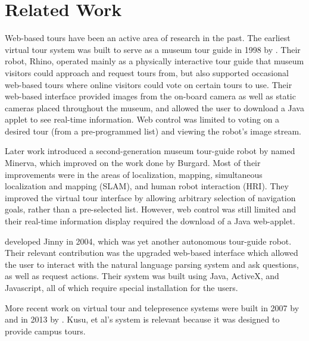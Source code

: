 \documentclass[
  oneside,
  11pt, a4paper,
  footinclude=true,
  headinclude=true,
  cleardoublepage=empty
]{article}
\begin{document}
\section{Related Work}\label{sec:related}

Web-based tours have been an active area of research in the past. The earliest
virtual tour system was built to serve as a museum tour guide in 1998 by
\citet{burgard1998}. Their robot, Rhino, operated mainly as a physically
interactive tour guide that museum visitors could approach and request tours
from, but also supported occasional web-based tours where online visitors could
vote on certain tours to use. Their web-based interface provided images from
the on-board camera as well as static cameras placed throughout the museum, and
allowed the user to download a Java applet to see real-time information. Web
control was limited to voting on a desired tour (from a pre-programmed list)
and viewing the robot's image stream.

Later work introduced a second-generation museum tour-guide robot by
\citet{thrun1999} named Minerva, which improved on the work done by Burgard.
Most of their improvements were in the areas of localization, mapping,
simultaneous localization and mapping (SLAM), and human robot interaction
(HRI). They improved the virtual tour interface by allowing arbitrary selection
of navigation goals, rather than a pre-selected list. However, web control was
still limited and their real-time information display required the download of
a Java web-applet.

\citet{kim2004} developed Jinny in 2004, which was yet another autonomous
tour-guide robot. Their relevant contribution was the upgraded web-based
interface which allowed the user to interact with the natural language parsing
system and ask questions, as well as request actions. Their system was built
using Java, ActiveX, and Javascript, all of which require special installation
for the users.

More recent work on virtual tour and telepresence systems were built in 2007 by
\citet{michaud2007} and in 2013 by \citet{kusu2013}. Kusu, et al's system is
relevant because it was designed to provide campus tours.
\end{document}
